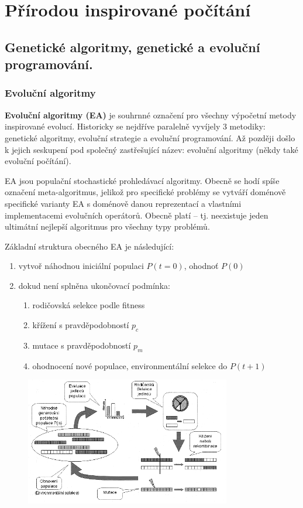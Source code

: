 \chapter{Přírodou inspirované počítání}
\section{Genetické algoritmy, genetické a evoluční programování.}
\subsection{Evoluční algoritmy}
\label{ea}
\textbf{Evoluční algoritmy (EA)} je souhrnné označení pro všechny výpočetní metody inspirované evolucí. Historicky se nejdříve paralelně vyvíjely 3 metodiky: genetické algoritmy, evoluční strategie a evoluční programování. Až později došlo k jejich seskupení pod společný zastřešující název: evoluční algoritmy (někdy také evoluční počítání).

EA jsou populační stochastické prohledávací algoritmy. Obecně se hodí spíše označení meta-algoritmus, jelikož pro specifické problémy se vytváří doménově specifické varianty EA s doménově danou reprezentací a vlastními implementacemi evolučních operátorů. Obecně platí  -- tj. neexistuje jeden ultimátní nejlepší algoritmus pro všechny typy problémů.

Základní struktura obecného EA je následující:
\begin{enumerate}
	
	
	\item vytvoř náhodnou iniciální populaci $P(t=0)$, ohodnoť $P(0)$
	\item dokud není splněna ukončovací podmínka:
	\begin{enumerate}
		
		
		\item rodičovská selekce podle fitness
		\item křížení s pravděpodobností $p_c$
		\item mutace s pravděpodobností $p_m$
		\item ohodnocení nové populace, environmentální selekce do $P(t+1)$
	\end{enumerate}
\end{enumerate}
\begin{figure}[H]
	\centering
	\includegraphics[width=0.8\textwidth]{img/ea.png}
\end{figure}

